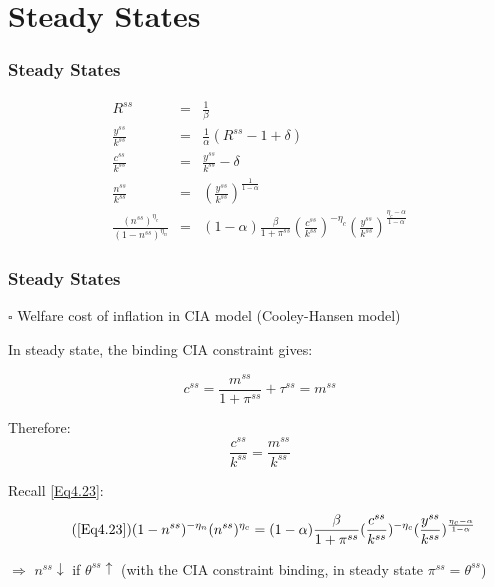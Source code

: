 \documentclass[handout]{beamer}
\begin{document}
\section{Steady States}

\begin{frame}
\frametitle{Steady States}\vskip 0.1in

\begin{eqnarray}
R^{ss} &=& \frac{1}{\beta} \label{Eq4.19}\\
\frac{y^{ss}}{k^{ss}} &=& \frac{1}{\alpha}(R^{ss}
-1+\delta)\label{Eq4.20}\\
\frac{c^{ss}}{k^{ss}} &=& \frac{y^{ss}}{k^{ss}}-\delta
\label{Eq4.21}\\
\frac{n^{ss}}{k^{ss}} &=&
(\frac{y^{ss}}{k^{ss}})^{\frac{1}{1-\alpha}} \label{Eq4.22}\\
\frac{(n^{ss})^{\eta_{c}}}{(1-n^{ss})^{\eta_{n}}} &=& (1-\alpha)
\frac{\beta}{1+\pi^{ss}} (\frac{c^{ss}}{k^{ss}})^{-\eta_{c}}
(\frac{y^{ss}}{k^{ss}})^{\frac{\eta_{c}-\alpha}{1-\alpha}}
\label{Eq4.23}
\end{eqnarray}

\end{frame}


\begin{frame}
\frametitle{Steady States}\vskip 0.1in

$\square$ Welfare cost of inflation in CIA model (Cooley-Hansen model) \\
\vskip 0.1in

In steady state, the binding CIA constraint gives:

\begin{equation}\label{Eq4.24}
c^{ss}=\frac{m^{ss}}{1+\pi^{ss}}+\tau^{ss}=m^{ss}
\end{equation}

Therefore:
\begin{equation}\label{Eq4.25}
\frac{c^{ss}}{k^{ss}}=\frac{m^{ss}}{k^{ss}}
\end{equation}

Recall \eqref{Eq4.23}:

\begin{equation}\tag{\eqref{Eq4.23}}
(1-n^{ss})^{-\eta_{n}} (n^{ss})^{\eta_{c}} = (1-\alpha)
\frac{\beta}{1+\pi^{ss}} (\frac{c^{ss}}{k^{ss}})^{-\eta_{c}}
(\frac{y^{ss}}{k^{ss}})^{\frac{\eta_{c}-\alpha}{1-\alpha}}
\end{equation}

$\Rightarrow$ $n^{ss}\downarrow$ if $\theta^{ss}\uparrow$ (with the
CIA constraint binding, in steady state $\pi^{ss}=\theta^{ss}$)


\end{frame}
\end{document}
